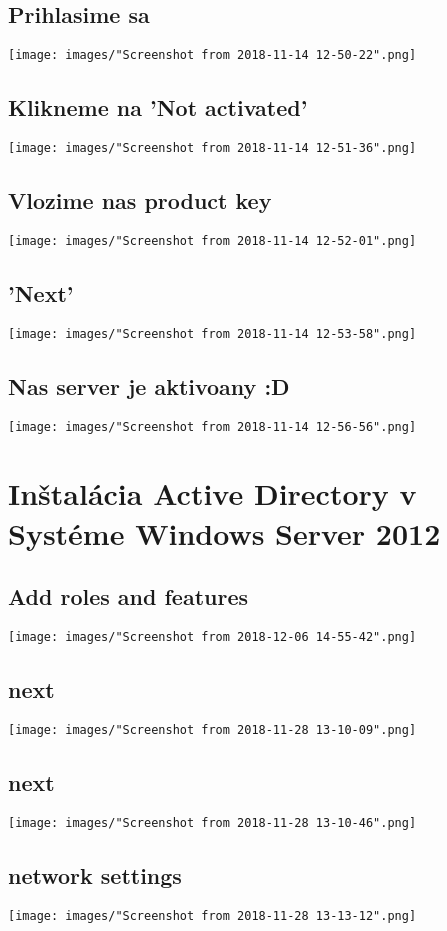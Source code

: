 \documentclass[slovak]{article}
\begin{document}
  \subsection{Prihlasime sa}
  \texttt{[image: images/"Screenshot from 2018-11-14 12-50-22".png]}
  \subsection{Klikneme na 'Not activated'}
  \texttt{[image: images/"Screenshot from 2018-11-14 12-51-36".png]}
  \subsection{Vlozime nas product key}
  \texttt{[image: images/"Screenshot from 2018-11-14 12-52-01".png]}
  \subsection{'Next'}
  \texttt{[image: images/"Screenshot from 2018-11-14 12-53-58".png]}
  \subsection{Nas server je aktivoany :D}
  \texttt{[image: images/"Screenshot from 2018-11-14 12-56-56".png]}

  \newpage
  \section{Inštalácia Active Directory v Systéme Windows Server 2012}
  \subsection{Add roles and features}
  \texttt{[image: images/"Screenshot from 2018-12-06 14-55-42".png]}
  \subsection{next}
  \texttt{[image: images/"Screenshot from 2018-11-28 13-10-09".png]}
  \subsection{next}
  \texttt{[image: images/"Screenshot from 2018-11-28 13-10-46".png]}
  \subsection{network settings}
  \texttt{[image: images/"Screenshot from 2018-11-28 13-13-12".png]}
\end{document}

